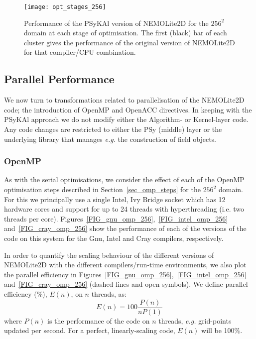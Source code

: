 \documentclass[gmd, manuscript]{copernicus}
\begin{document}
\begin{figure}[!t]
\centering
\texttt{[image: opt\_stages\_256]}
\caption{Performance of the {PS}y{KA}l version of NEMOLite2D for the
  $256^{2}$ domain at each stage of optimisation. The first (black)
  bar of each cluster gives the performance of the original version of
  NEMOLite2D for that compiler/CPU combination.}
\label{FIG_opt_stages_256}
\end{figure}

\subsection{Parallel Performance}

We now turn to transformations related to parallelisation of the
NEMOLite2D code; the introduction of OpenMP and OpenACC directives. In
keeping with the {PS}y{KA}l approach we do not modify either the
Algorithm- or Kernel-layer code.  Any code changes are restricted to
either the PSy (middle) layer or the underlying library that manages
\textit{e.g.} the construction of field objects.

\subsubsection{OpenMP}

As with the serial optimisations, we consider the effect of each of
the OpenMP optimisation steps described in Section~\ref{sec_omp_steps}
for the $256^2$ domain. For this we principally use a single Intel,
Ivy Bridge socket which has 12 hardware cores and support for up to 24
threads with hyperthreading (i.e. two threads per core).
Figures~\ref{FIG_gnu_omp_256},~\ref{FIG_intel_omp_256}
and~\ref{FIG_cray_omp_256} show the performance of each of the
versions of the code on this system for the Gnu, Intel and Cray
compilers, respectively.

In order to quantify the scaling behaviour of the different versions
of NEMOLite2D with the different compilers/run-time environments, we
also plot the parallel efficiency in
Figures~\ref{FIG_gnu_omp_256},~\ref{FIG_intel_omp_256}
and~\ref{FIG_cray_omp_256} (dashed lines and open symbols). We define
parallel efficiency (\%), $E(n)$, on $n$ threads, as:
\[
E(n) = 100  \frac{P(n)}{ n P(1)}
\]
where $P(n)$ is the performance of the code on $n$ threads,
\textit{e.g.} grid-points updated per second. For a
perfect, linearly-scaling code, $E(n)$ will be 100\%.
\end{document}
